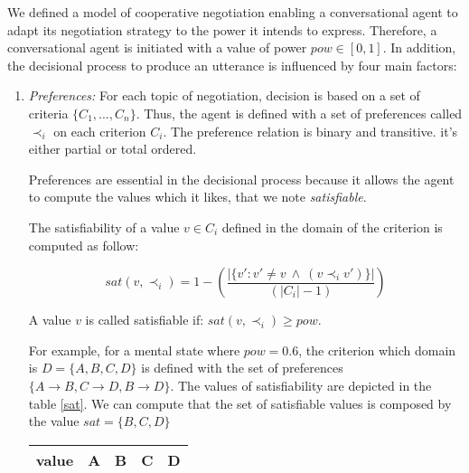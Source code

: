\documentclass{llncs}
\begin{document}
		We defined a model of cooperative negotiation enabling a conversational agent to adapt its negotiation strategy to the power it intends to express.  Therefore, a conversational agent is initiated with a value of power $pow \in [0,1]$. In addition, the decisional process to produce an utterance is influenced by four main factors:
	\begin{enumerate}
		
		\item \emph{Preferences:} For each topic of negotiation, decision is based on a set of criteria $\{C_1, ..., C_n\}$. Thus, the agent is defined with a set of preferences  called $\prec_i$ on each criterion $C_i$. The preference relation is binary and transitive. it's either partial or total ordered. 
		
		
		Preferences are essential in the decisional process because it allows the agent to compute the values which it likes, that we note \textit{satisfiable}.
		
		The satisfiability of a value $v \in C_i$ defined in the domain of the criterion is computed as follow: 
		
			\begin{equation}
			sat(v, \prec_i) =	1 - \left( \frac{|\{v' : v' \neq v \  \wedge \ (v \prec_i v')\}| }{( |C_i| - 1 )}\right)
			\end{equation}
	
	
		A value $v$ is called satisfiable if:
		 	$sat(v, \prec_i) \geq pow$.
		
		
		\par For example, for  a mental state where $pow =0.6$, the criterion which domain is  $D =\{A, B, C, D\}$ is defined with the set of preferences $\{A \rightarrow  B, C \rightarrow  D , B \rightarrow D \}$. The values of satisfiability are depicted in the table \ref{sat}. We can compute that the set of satisfiable values is composed by the value $sat = \{B, C, D\}$ 
			 \begin{table}
			 	\centering
			 	\begin{tabular}{ |c|c|c|c|c| }
			 		\hline				
			 		value & A & B & C & D \\
			 		\hline


\end{tabular}
\end{table}
\end{enumerate}
\end{document}
